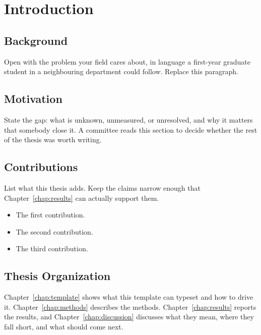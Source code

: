 
\chapter{Introduction}\label{chap:introduction}

\section{Background}

Open with the problem your field cares about, in language a first-year graduate
student in a neighbouring department could follow. Replace this paragraph.

\lipsum[1][1-6]

\section{Motivation}

State the gap: what is unknown, unmeasured, or unresolved, and why it matters
that somebody close it. A committee reads this section to decide whether the
rest of the thesis was worth writing.

\lipsum[2][1-5]

\section{Contributions}

List what this thesis adds. Keep the claims narrow enough that
Chapter~\ref{chap:results} can actually support them.

\begin{itemize}
  \item The first contribution.
  \item The second contribution.
  \item The third contribution.
\end{itemize}

\section{Thesis Organization}

Chapter~\ref{chap:template} shows what this template can typeset and how to
drive it. Chapter~\ref{chap:methods} describes the methods.
Chapter~\ref{chap:results} reports the results, and
Chapter~\ref{chap:discussion} discusses what they mean, where they fall short,
and what should come next.
